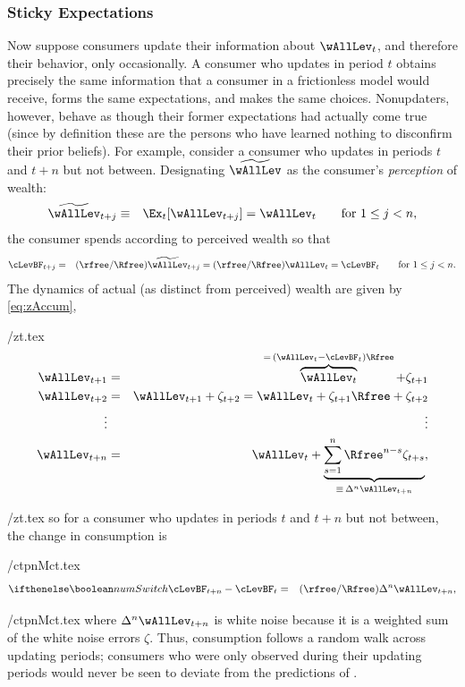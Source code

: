 \documentclass[titlepage]{\econtex}\newcommand{\texname}{cAndCwithStickyE}
\begin{document}
\subsubsection*{Sticky Expectations}

Now suppose consumers update their information about $\wAllLev_t$, and therefore their behavior, only occasionally.  A consumer who updates in period $t$ obtains precisely the same information that a consumer in a frictionless model would receive, forms the same expectations, and makes the same choices.  Nonupdaters, however, behave as though their former expectations had actually come true (since by definition these are the persons who have learned nothing to disconfirm their prior beliefs).  For example, consider a consumer who updates in periods $t$ and $t+n$ but not between.  Designating $\perc{\wAllLev}$ as the consumer's {\it perception} of wealth:
  \begin{eqnarray*}
\perc{\wAllLev}_{t+j} & \equiv & \Ex_{t}[\wAllLev_{t+j}] = \wAllLev_{t} \qquad \text{for }  1\le j < n,
\end{eqnarray*}
  the consumer spends according to perceived wealth so that
  \begin{eqnarray*}
\cLevBF_{t+j} & = & (\rfree/\Rfree)\perc{\wAllLev}_{t+j} = (\rfree/\Rfree)     \wAllLev _{t} = \cLevBF_{t} \qquad \text{for }  1\le j < n.
\end{eqnarray*}
The dynamics of actual (as distinct from perceived) wealth are given by \eqref{eq:zAccum},
\begin{verbatimwrite}{\eq/zt.tex}
\begin{eqnarray*}
        \wAllLev_{t+1} & = & \overbrace{\wAllLev_{t}}^{=\,(\wAllLev_{t}-\cLevBF_{t})\Rfree}+\zeta_{t+1}  \\
        \wAllLev_{t+2} & = & \wAllLev_{t+1}+\zeta_{t+2}=\wAllLev_{t}+\zeta_{t+1}\Rfree + \zeta_{t+2}
\\ \vdots       &   & \vdots \nonumber
\\  \wAllLev_{t+n} & = & \wAllLev_{t}+\underbrace{\sum_{s=1}^{n} \Rfree^{n-s}\zeta_{t+s}}_{\equiv\,\Delta^{n} \wAllLev_{t+n}},
\end{eqnarray*}
\end{verbatimwrite}
 \eq/zt.tex
so for a consumer who updates in periods $t$ and $t+n$ but not between, the change in consumption is
\begin{verbatimwrite}{\eq/ctpnMct.tex}
\begin{eqnarray*}
\ifnumSw        \cLevBF_{t+n}-\cLevBF_{t}  & = & (\rfree/\Rfree)\Delta^{n}\wAllLev_{t+n},
\end{eqnarray*}
\end{verbatimwrite}
 {\eq/ctpnMct.tex} where $\Delta^{n}\wAllLev_{t+n}$ is white noise because it is a weighted sum of the white noise errors $\zeta$.  Thus, consumption follows a random walk across updating periods; consumers who were only observed during their updating periods would never be seen to deviate from the predictions of \cite{hallRandomWalk}.
\end{document}
